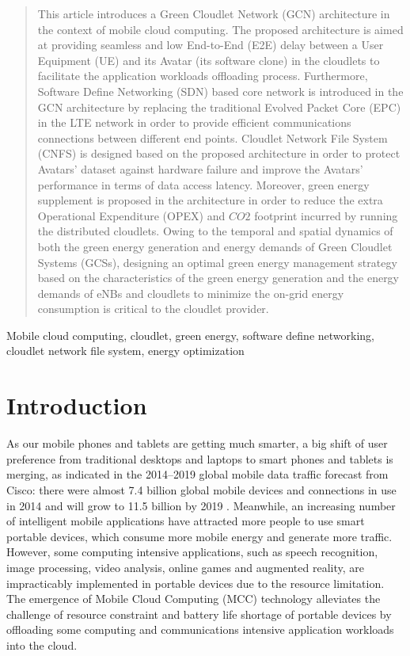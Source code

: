 \documentclass[journal,12pt,draftclsnofoot,onecolumn]{IEEEtran}
\begin{document}
\begin{abstract}
This article introduces a Green Cloudlet Network (GCN) architecture in the context of mobile cloud computing. The proposed architecture is aimed at providing seamless and low End-to-End (E2E) delay between a User Equipment (UE) and its Avatar (its software clone) in the cloudlets to facilitate the application workloads offloading process. Furthermore, Software Define Networking (SDN) based core network is introduced in the GCN architecture by replacing the traditional Evolved Packet Core (EPC) in the LTE network in order to provide efficient communications connections between different end points. Cloudlet Network File System (CNFS) is designed based on the proposed architecture in order to protect Avatars' dataset against hardware failure and improve the Avatars' performance in terms of data access latency. Moreover, green energy supplement is proposed in the architecture in order to reduce the extra Operational Expenditure (OPEX) and $CO2$ footprint incurred by running the distributed cloudlets. Owing to the temporal and spatial dynamics of both the green energy generation and energy demands of Green Cloudlet Systems (GCSs), designing an optimal green energy management strategy based on the characteristics of the green energy generation and the energy demands of eNBs and cloudlets to minimize the on-grid energy consumption is critical to the cloudlet provider.
\end{abstract}

\begin{IEEEkeywords}
Mobile cloud computing, cloudlet, green energy, software define networking, cloudlet network file system, energy optimization
\end{IEEEkeywords}
\IEEEpeerreviewmaketitle



\section{Introduction}
As our mobile phones and tablets are getting much smarter, a big shift of user preference from traditional desktops and laptops to smart phones and tablets is merging, as indicated in the 2014--2019 global mobile data traffic forecast from Cisco: there were almost 7.4 billion global mobile devices and connections in use in 2014 and will grow to 11.5 billion by 2019 \cite{1}. Meanwhile, an increasing number of intelligent mobile applications have attracted more people to use smart portable devices, which consume more mobile energy and generate more traffic. However, some computing intensive applications, such as speech recognition, image processing, video analysis, online games and augmented reality, are impracticably implemented in portable devices due to the resource limitation. The emergence of Mobile Cloud Computing (MCC) technology alleviates the challenge of resource constraint and battery life shortage of portable devices by offloading some computing and communications intensive application workloads into the cloud.
\end{document}

